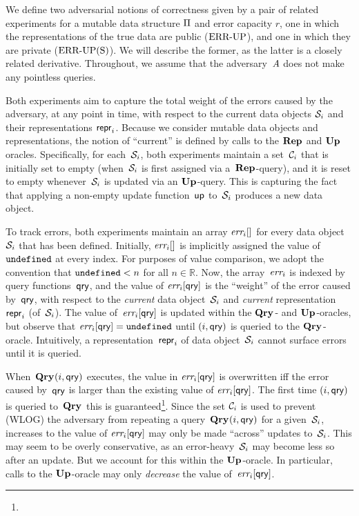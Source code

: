 
%
We define two adversarial notions of correctness given by a pair of related experiments for a mutable data structure $\mathrm{\Pi}$ and error capacity $r$, one in which the representations of the true data are public ($\textnormal{ERR\mbox{-}UP}$), and one in which they are private ($\textnormal{ERR\mbox{-}UP(S)}$).  We will describe the former, as the latter is a closely related derivative.  Throughout, we assume that the adversary~$\mathit{A}$ does not make any pointless queries. 

Both experiments aim to capture the total weight of the errors caused by the adversary, at any point in time, with respect to the current data objects $\mathcal{S}_i$ and their representations $\mathsf{repr}_i$.  Because we consider mutable data objects and representations, the notion of ``current'' is defined by calls to the $\mathbf{Rep}\hspace{0.5pt}$ and $\mathbf{Up}\hspace{0.5pt}$ oracles.  Specifically, for each~$\mathcal{S}_i$, both experiments maintain a set~$\mathcal{C}_i$ that is initially set to empty (when~$\mathcal{S}_i$ is first assigned via a~$\mathbf{Rep}\hspace{0.5pt}$-query), and it is reset to empty whenever~$\mathcal{S}_i$ is updated via an $\mathbf{Up}\hspace{0.5pt}$-query.  This is capturing the fact that applying a non-empty update function~$\mathsf{up}$ to~$\mathcal{S}_i$ produces a new data object.

To track errors, both experiments maintain an array $\textit{err}_i[]$ for every data object~$\mathcal{S}_i$ that has been defined.   Initially, $\textit{err}_i[]$ is implicitly assigned the value of~$\mathtt{undefined}$ at every index.  For purposes of value comparison, we adopt the convention that $\mathtt{undefined} < n$ for all $n \in \mathbb{R}$.
%
Now, the array~$\textit{err}_i$ is indexed by query functions~$\mathsf{qry}$, and the value of $\textit{err}_i[\mathsf{qry}]$ is the ``weight'' of the error caused by~$\mathsf{qry}$, with respect to the \emph{current} data object~$\mathcal{S}_i$ and \emph{current} representation~$\mathsf{repr}_i$ (of~$\mathcal{S}_i$).  
%
The value of~$\textit{err}_i[\mathsf{qry}]$ is updated within the $\mathbf{Qry}\hspace{0.5pt}$- and $\mathbf{Up}\hspace{0.5pt}$-oracles, but observe that $\textit{err}_i[\mathsf{qry}] = \mathtt{undefined}$ until $(i,\mathsf{qry})$ is queried to the $\mathbf{Qry}\hspace{0.5pt}$-oracle.  Intuitively, a representation~$\mathsf{repr}_i$ of data object~$\mathcal{S}_i$ cannot surface errors until it is queried.

When~$\mathbf{Qry}\hspace{0.5pt}(i,\mathsf{qry})$ executes, the value in $\textit{err}_i[\mathsf{qry}]$ is overwritten iff the error caused by~$\mathsf{qry}$ is larger than the existing value of $\textit{err}_i[\mathsf{qry}]$.  The first time $(i,\mathsf{qry})$ is queried to~$\mathbf{Qry}\hspace{0.5pt}$ this is guaranteed\footnote{}.  Since the set $\mathcal{C}_i$ is used to prevent (WLOG) the adversary from repeating a query~$\mathbf{Qry}\hspace{0.5pt}(i,\mathsf{qry})$ for a given~$\mathcal{S}_i$, increases to the value of $\textit{err}_i[\mathsf{qry}]$ may only be made ``across'' updates to~$\mathcal{S}_i$.  This may seem to be overly conservative, as an error-heavy~$\mathcal{S}_i$ may become less so after an update.  But we account for this within the $\mathbf{Up}\hspace{0.5pt}$-oracle.
In particular, calls to the $\mathbf{Up}\hspace{0.5pt}$-oracle may only \emph{decrease} the value of~$\textit{err}_i[\mathsf{qry}]$.  

